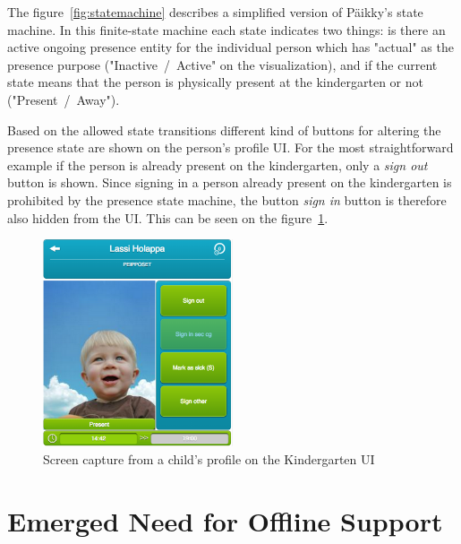 The figure~\ref{fig:statemachine} describes a simplified version of Päikky's state machine. In this finite-state machine each state indicates two things: is there an active ongoing presence entity for the individual person which has "actual" as the presence purpose ("Inactive~/~Active" on the visualization), and if the current state means that the person is physically present at the kindergarten or not ("Present~/~Away").

Based on the allowed state transitions different kind of buttons for altering the presence state are shown on the person's profile UI. For the most straightforward example if the person is already present on the kindergarten, only a \textit{sign out} button is shown. Since signing in a person already present on the kindergarten is prohibited by the presence state machine, the button \textit{sign in} button is therefore also hidden from the UI. This can be seen on the figure~\ref{fig:child-profile}. 


\begin{figure}[t]
\begin{center}
\includegraphics[width=0.5\textwidth]{assets/child-profile.png}
\end{center}
\caption{Screen capture from a child's profile on the Kindergarten UI}
\label{fig:child-profile}
\end{figure}








\section{Emerged Need for Offline Support}

